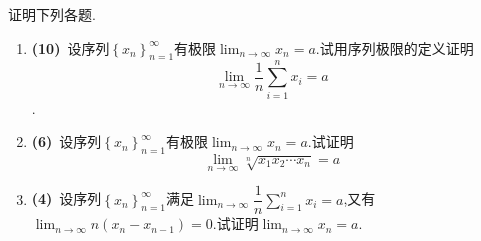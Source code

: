 \documentclass{ctexart}
\begin{document}
\begin{problem}
    证明下列各题.
        \begin{enumerate}[label=\textbf{(\arabic*)}]
            \item \textbf{(10)}\ 设序列$\left\{x_n\right\}_{n=1}^{\infty}$有极限$\displaystyle\lim_{n\to\infty}x_n=a$.试用序列极限的定义证明$$\displaystyle\lim_{n\to\infty}\dfrac{1}{n}\sum_{i=1}^{n}x_i=a$$.
            \item \textbf{(6)}\ 设序列$\left\{x_n\right\}_{n=1}^{\infty}$有极限$\displaystyle\lim_{n\to\infty}x_n=a$.试证明$$\lim_{n\to\infty}\sqrt[n]{x_1x_2\cdots x_n}=a$$
            \item \textbf{(4)}\ 设序列$\left\{x_n\right\}_{n=1}^{\infty}$满足$\displaystyle\lim_{n\to\infty}\dfrac{1}{n}\sum_{i=1}^{n}x_i=a$,又有$\displaystyle\lim_{n\to\infty}n\left(x_n-x_{n-1}\right)=0$.试证明$\displaystyle\lim_{n\to\infty}x_n=a$.
        \end{enumerate}
\end{problem}
\end{document}
